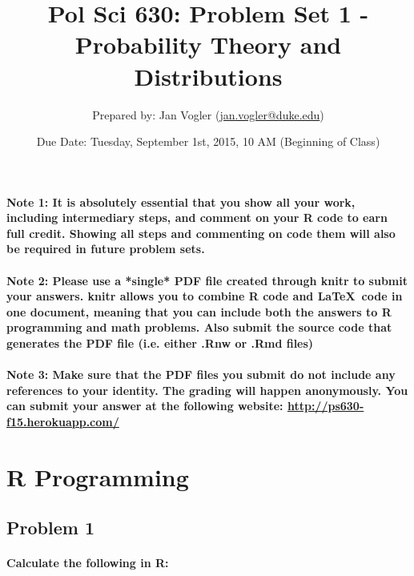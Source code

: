 \documentclass[12pt,letter]{article}
\begin{document}
\title{Pol Sci 630: Problem Set 1 - Probability Theory and Distributions}

\author{Prepared by: Jan Vogler (\href{mailto:jan.vogler@duke.edu}{jan.vogler@duke.edu})}

\date{Due Date: Tuesday, September 1st, 2015, 10 AM (Beginning of Class)}
 
\maketitle 



\paragraph{Note 1: It is absolutely essential that you show all your work, including intermediary steps, and comment on your R code to earn full credit. Showing all steps and commenting on code them will also be required in future problem sets.}

\paragraph{Note 2: Please use a *single* PDF file created through knitr to submit your answers. knitr allows you to combine R code and \LaTeX \ code in one document, meaning that you can include both the answers to R programming and math problems. Also submit the source code that generates the PDF file (i.e. either .Rnw or .Rmd files)}

\paragraph{Note 3: Make sure that the PDF files you submit do not include any references to your identity. The grading will happen anonymously. You can submit your answer at the following website: \url{http://ps630-f15.herokuapp.com/}}



\section*{R Programming}

\subsection*{Problem 1}

\paragraph{Calculate the following in R:}
\end{document}
